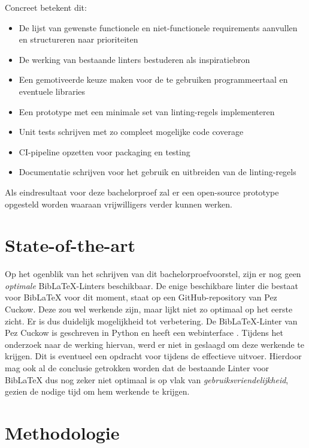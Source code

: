 Concreet betekent dit:
\begin{itemize}
  \item De lijst van gewenste functionele en niet-functionele requirements aanvullen en structureren naar prioriteiten
  \item De werking van bestaande linters bestuderen als inspiratiebron
  \item Een gemotiveerde keuze maken voor de te gebruiken programmeertaal en eventuele libraries
  \item Een prototype met een minimale set van linting-regels implementeren
  \item Unit tests schrijven met zo compleet mogelijke code coverage
  \item CI-pipeline opzetten voor packaging en testing
  \item Documentatie schrijven voor het gebruik en uitbreiden van de linting-regels
\end{itemize}

Als eindresultaat voor deze bachelorproef zal er een open-source prototype opgesteld worden waaraan vrijwilligers verder kunnen werken.



\section{State-of-the-art}%
\label{sec:state-of-the-art}

Op het ogenblik van het schrijven van dit bachelorproefvoorstel, zijn er nog geen \emph{optimale} BibLaTeX-Linters beschikbaar. De enige beschikbare linter die bestaat voor BibLaTeX voor dit moment, 
staat op een GitHub-repository van Pez Cuckow. Deze zou wel werkende zijn, maar lijkt niet zo optimaal op het eerste zicht. Er is dus duidelijk mogelijkheid tot verbetering. De BibLaTeX-Linter van Pez Cuckow
is geschreven in Python en heeft een webinterface \autocite{Cuckow2022}. Tijdens het onderzoek naar de werking hiervan, werd er niet in geslaagd om deze werkende te krijgen. Dit is eventueel een opdracht voor tijdens 
de effectieve uitvoer. Hierdoor mag ook al de conclusie getrokken worden dat de bestaande Linter voor BibLaTeX dus nog zeker niet optimaal is op vlak van \emph{gebruiksvriendelijkheid}, gezien de nodige tijd om hem werkende te krijgen.


\section{Methodologie}%
\label{sec:methodologie}

